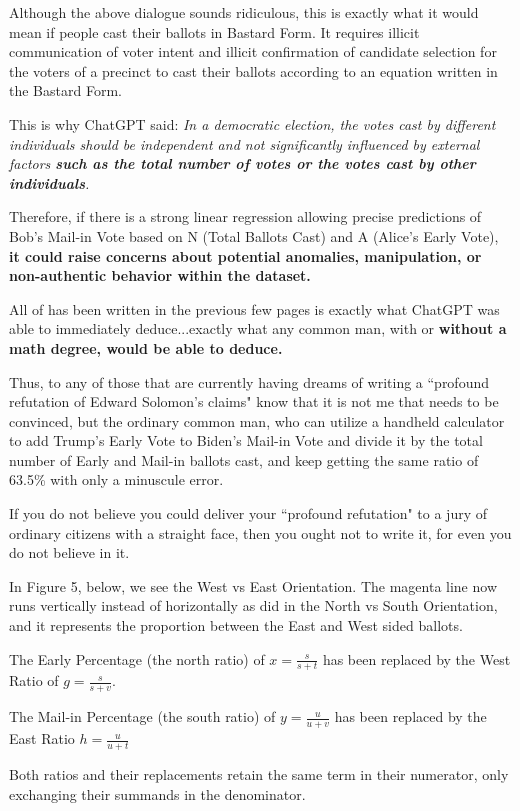 \documentclass[preprint,13pt]{elsarticle}
\begin{document}
Although the above dialogue sounds ridiculous, this is exactly what it would mean if people cast their ballots in Bastard Form. It requires illicit communication of voter intent and illicit confirmation of candidate selection for the voters of a precinct to cast their ballots according to an equation written in the Bastard Form. 

This is why ChatGPT said: \textit{In a democratic election, the votes cast by different individuals should be independent and not significantly influenced by external factors \textbf{such as the total number of votes or the votes cast by other individuals}.}

Therefore, if there is a strong linear regression allowing precise predictions of Bob's Mail-in Vote based on N (Total Ballots Cast) and A (Alice's Early Vote), \textbf{it could raise concerns about potential anomalies, manipulation, or non-authentic behavior within the dataset.}

All of has been written in the previous few pages is exactly what ChatGPT was able to immediately deduce...exactly what any common man, with or \textbf{without a math degree, would be able to deduce.}

Thus, to any of those that are currently having dreams of writing a ``profound refutation of Edward Solomon's claims" know that it is not me that needs to be convinced, but the ordinary common man, who can utilize a handheld calculator to add Trump's Early Vote to Biden's Mail-in Vote and divide it by the total number of Early and Mail-in ballots cast, and keep getting the same ratio of 63.5\% with only a minuscule error.

If you do not believe you could deliver your ``profound refutation" to a jury of ordinary citizens with a straight face, then you ought not to write it, for even you do not believe in it.

\newpage
In Figure 5, below, we see the West vs East Orientation. The magenta line now runs vertically instead of horizontally as did in the North vs South Orientation, and it represents the proportion between the East and West sided ballots.

The Early Percentage (the north ratio) of $x=\frac{s}{s+t}$ has been replaced by the West Ratio of $g=\frac{s}{s+v}$.

The Mail-in Percentage (the south ratio) of $y=\frac{u}{u+v}$ has been replaced by the East Ratio $h=\frac{u}{u+t}$

Both ratios and their replacements retain the same term in their numerator, only exchanging their summands in the denominator.
\end{document}
